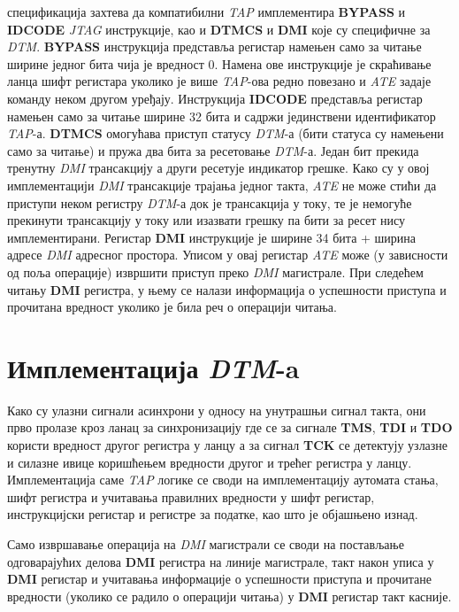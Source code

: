  спецификација \cite{debug_spec} захтева да компатибилни \textit{\acrshort{TAP}} имплементира \textbf{BYPASS} и \textbf{IDCODE} \textit{\acrshort{JTAG}} инструкције, као и \textbf{\acrshort{DTMCS}} и \textbf{\acrshort{DMI}} које су специфичне за  \textit{\acrshort{DTM}}. \textbf{BYPASS} инструкција представља регистар намењен само за читање ширине једног бита чија је вредност 0. Намена ове инструкције је скраћивање ланца шифт регистара уколико је више \textit{\acrshort{TAP}}-ова редно повезано и \textit{\acrshort{ATE}} задаје команду неком другом уређају. Инструкција \textbf{IDCODE} представља регистар намењен само за читање ширине 32 бита и садржи јединствени идентификатор \textit{\acrshort{TAP}}-а. \textbf{DTMCS} омогућава приступ статусу \textit{\acrshort{DTM}}-а (бити статуса су намењени само за читање) и пружа два бита за ресетовање \textit{\acrshort{DTM}}-а. Један бит прекида тренутну \textit{\acrshort{DMI}} трансакцију а други ресетује индикатор грешке. Како су у овој имплементацији \textit{\acrshort{DMI}} трансакције трајања једног такта, \textit{\acrshort{ATE}} не може стићи да приступи неком регистру \textit{\acrshort{DTM}}-а док је трансакција у току, те је немогуће прекинути трансакцију у току или изазвати грешку па бити за ресет нису имплементирани. Регистар \textbf{\acrshort{DMI}} инструкције је ширине 34 бита + ширина адресе \textit{\acrshort{DMI}} адресног простора. Уписом у овај регистар \textit{\acrshort{ATE}} може (у зависности од поља операције) извршити приступ преко \textit{\acrshort{DMI}} магистрале. При следећем читању \textbf{\acrshort{DMI}} регистра, у њему се налази информација о успешности приступа и прочитана вредност уколико је била реч о операцији читања. \newpage

\section{Имплементација \textit{\acrshort{DTM}}-a}

Како су улазни сигнали асинхрони у односу на унутрашњи сигнал такта, они прво пролазе кроз ланац за синхронизацију где се за сигнале \textbf{\acrfull{TMS}}, \textbf{\acrfull{TDI}} и \textbf{\acrfull{TDO}} користи вредност другог регистра у ланцу а за сигнал \textbf{\acrfull{TCK}} се детектују узлазне и силазне ивице коришћењем вредности другог и трећег регистра у ланцу. Имплементација саме \textit{\acrshort{TAP}} логике се своди на имплементацију аутомата стања, шифт регистра и учитавања правилних вредности у шифт регистар, инструкцијски регистар и регистре за податке, као што је објашњено изнад.

Само извршавање операција на \textit{\acrshort{DMI}} магистрали се своди на постављање одговарајућих делова \textbf{\acrshort{DMI}} регистра на линије магистрале, такт након уписа у \textbf{\acrshort{DMI}} регистар и учитавања информације о успешности приступа и прочитане вредности (уколико се радило о операцији читања) у \textbf{\acrshort{DMI}} регистар такт касније.